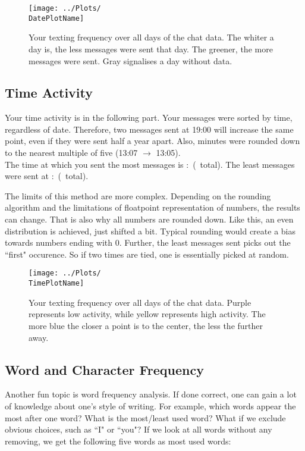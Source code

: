 \documentclass{WAReport}
\begin{document}
\begin{figure}[h!]
    \texttt{[image: ../Plots/\\DatePlotName]}
    \caption{Your texting frequency over all days of the chat data. The whiter a day is, the less messages were sent that day. The greener, the more messages were sent. Gray signalises a day without data.}
    \label{fig:day_activity}
\end{figure}

\subsection{Time Activity}
Your time activity is in the following part. Your messages were sorted by time, regardless of date. Therefore, two messages sent at 19:00 will increase the same point, even if they were sent half a year apart. Also, minutes were rounded down to the nearest multiple of five (13:07 $\rightarrow$ 13:05). \\

The time at which you sent the most messages is \MostMsgTimeHour:\MostMsgTimeMin \, (\MostMsgTime \, total). The least messages were sent at \LeastMsgTimeHour:\LeastMsgTimeMin \, (\LeastMsgTime \, total). 

The limits of this method are more complex. Depending on the rounding algorithm and the limitations of floatpoint representation of numbers, the results can change. That is also why all numbers are rounded down. Like this, an even distribution is achieved, just shifted a bit. Typical rounding would create a bias towards numbers ending with 0. Further, the least messages sent picks out the ``first" occurence. So if two times are tied, one is essentially picked at random. 

\begin{figure}[h!]
    \texttt{[image: ../Plots/\\TimePlotName]}
    \caption{Your texting frequency over all days of the chat data. Purple represents low activity, while yellow represents high activity. The more blue the closer a point is to the center, the less the further away.}
    \label{fig:hour_activity}
\end{figure}

\subsection{Word and Character Frequency}

Another fun topic is word frequency analysis. If done correct, one can gain a lot of knowledge about one's style of writing. For example, which words appear the most after one word? What is the most/least used word? What if we exclude obvious choices, such as ``I" or ``you"? If we look at all words without any removing, we get the following five words as most used words:
\end{document}

